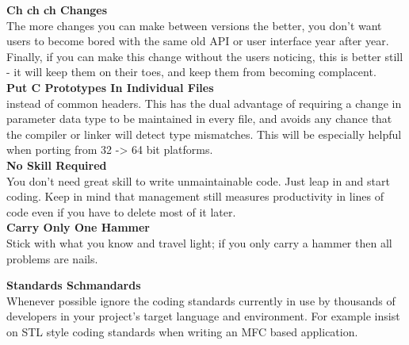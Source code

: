 \documentclass[11pt,twoside,a4paper]{article}
\begin{document}
\textbf{Ch ch ch Changes}~\\
The more changes you can make between versions the better, you don't want users to become bored with the same old API or user interface year after year. Finally, if you can make this change without the users noticing, this is better still - it will keep them on their toes, and keep them from becoming complacent. ~\\

\textbf{Put C Prototypes In Individual Files}~\\
instead of common headers. This has the dual advantage of requiring a change in parameter data type to be maintained in every file, and avoids any chance that the compiler or linker will detect type mismatches. This will be especially helpful when porting from 32 -> 64 bit platforms. ~\\

\textbf{No Skill Required}~\\
You don't need great skill to write unmaintainable code. Just leap in and start coding. Keep in mind that management still measures productivity in lines of code even if you have to delete most of it later. ~\\

\textbf{Carry Only One Hammer}~\\
Stick with what you know and travel light; if you only carry a hammer then all problems are nails. ~\\

\clearpage

\textbf{Standards Schmandards}~\\
Whenever possible ignore the coding standards currently in use by thousands of developers in your project's target language and environment. For example insist on STL style coding standards when writing an MFC based application. ~\\
\end{document}

